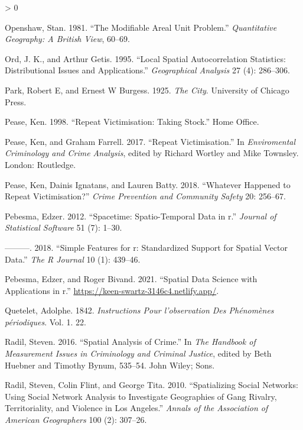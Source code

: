 \documentclass[
  krantz2]{krantz}
\newlength{\cslhangindent}
\newenvironment{CSLReferences}[2] %
 {%
  \setlength{\parindent}{0pt}
  \ifodd #1 \everypar{\setlength{\hangindent}{\cslhangindent}}\ignorespaces\fi
  \ifnum #2 > 0
  \setlength{\parskip}{#2\baselineskip}
  \fi
 }%
 {}
\begin{document}
\begin{CSLReferences}{1}{0}
\leavevmode\hypertarget{ref-Openshaw_1981}{}%
Openshaw, Stan. 1981. {``The Modifiable Areal Unit Problem.''} \emph{Quantitative Geography: A British View}, 60--69.

\leavevmode\hypertarget{ref-Ord_1995}{}%
Ord, J. K., and Arthur Getis. 1995. {``Local Spatial Autocorrelation Statistics: Distributional Issues and Applications.''} \emph{Geographical Analysis} 27 (4): 286--306.

\leavevmode\hypertarget{ref-Park_1925}{}%
Park, Robert E, and Ernest W Burgess. 1925. \emph{The City}. University of Chicago Press.

\leavevmode\hypertarget{ref-Pease_1998}{}%
Pease, Ken. 1998. {``Repeat Victimisation: Taking Stock.''} Home Office.

\leavevmode\hypertarget{ref-Pease_2017}{}%
Pease, Ken, and Graham Farrell. 2017. {``Repeat Victimisation.''} In \emph{Enviromental Criminology and Crime Analysis}, edited by Richard Wortley and Mike Townsley. London: Routledge.

\leavevmode\hypertarget{ref-Pease_2018}{}%
Pease, Ken, Dainis Ignatans, and Lauren Batty. 2018. {``Whatever Happened to Repeat Victimisation?''} \emph{Crime Prevention and Community Safety} 20: 256--67.

\leavevmode\hypertarget{ref-Pebesma_2012}{}%
Pebesma, Edzer. 2012. {``Spacetime: Spatio-Temporal Data in r.''} \emph{Journal of Statistical Software} 51 (7): 1--30.

\leavevmode\hypertarget{ref-Pebesma_2018}{}%
---------. 2018. {``Simple Features for r: Standardized Support for Spatial Vector Data.''} \emph{The R Journal} 10 (1): 439--46.

\leavevmode\hypertarget{ref-Pebesma_2021}{}%
Pebesma, Edzer, and Roger Bivand. 2021. {``Spatial Data Science with Applications in r.''} \url{https://keen-swartz-3146c4.netlify.app/}.

\leavevmode\hypertarget{ref-Quetelet_1842}{}%
Quetelet, Adolphe. 1842. \emph{Instructions Pour l'observation Des Ph{é}nom{è}nes p{é}riodiques}. Vol. 1. 22.

\leavevmode\hypertarget{ref-Radil_2016}{}%
Radil, Steven. 2016. {``Spatial Analysis of Crime.''} In \emph{The Handbook of Measurement Issues in Criminology and Criminal Justice}, edited by Beth Huebner and Timothy Bynum, 535--54. John Wiley; Sons.

\leavevmode\hypertarget{ref-Radil_2010}{}%
Radil, Steven, Colin Flint, and George Tita. 2010. {``Spatializing Social Networks: Using Social Network Analysis to Investigate Geographies of Gang Rivalry, Territoriality, and Violence in Los Angeles.''} \emph{Annals of the Association of American Geographers} 100 (2): 307--26.


\end{CSLReferences}
\end{document}
